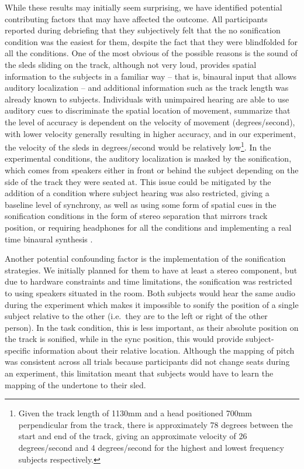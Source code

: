 \documentclass[10pt,a4paper,onecolumn]{article}
\begin{document}
While these results may initially seem surprising, we have identified potential contributing factors that may have affected the outcome. All participants reported during debriefing that they subjectively felt that the no sonification condition was the easiest for them, despite the fact that they were blindfolded for all the conditions. One of the most obvious of the possible reasons is the sound of the sleds sliding on the track, although not very loud, provides spatial information to the subjects in a familiar way -- that is, binaural input that allows auditory localization -- and additional information such as the track length was already known to subjects. Individuals with unimpaired hearing are able to use auditory cues to discriminate the spatial location of movement, \textcite{carlilePerceptionAuditoryMotion2016} summarize that the level of accuracy is dependent on the velocity of movement (degrees/second), with lower velocity generally resulting in higher accuracy, and in our experiment, the velocity of the sleds in degrees/second would be relatively low\footnote{Given the track length of 1130mm and a head positioned 700mm perpendicular from the track, there is approximately 78 degrees between the start and end of the track, giving an approximate velocity of 26 degrees/second and 4 degrees/second for the highest and lowest frequency subjects respectively.}. In the experimental conditions, the auditory localization is masked by the sonification, which comes from speakers either in front or behind the subject depending on the side of the track they were seated at. This issue could be mitigated by the addition of a condition where subject hearing was also restricted, giving a baseline level of synchrony, as well as using some form of spatial cues in the sonification conditions in the form of stereo separation that mirrors track position, or requiring headphones for all the conditions and implementing a real time binaural synthesis \autocite{tommasiniComputationalModelImplement2019}.

Another potential confounding factor is the implementation of the sonification strategies. We initially planned for them to have at least a stereo component, but due to hardware constraints and time limitations, the sonification was restricted to using speakers situated in the room. Both subjects would hear the same audio during the experiment which makes it impossible to sonify the position of a single subject relative to the other (i.e.~they are to the left or right of the other person). In the task condition, this is less important, as their absolute position on the track is sonified, while in the sync position, this would provide subject-specific information about their relative location. Although the mapping of pitch was consistent across all trials because participants did not change seats during an experiment, this limitation meant that subjects would have to learn the mapping of the undertone to their sled.
\end{document}
